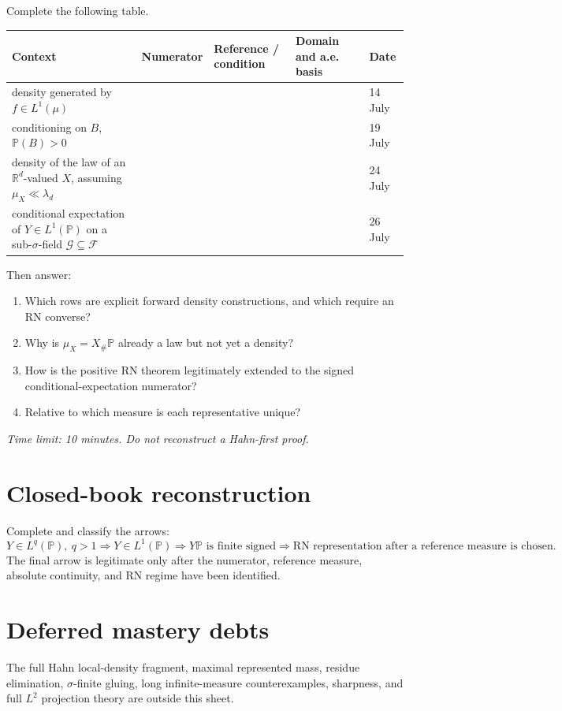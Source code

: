 Complete the following table.

\begin{center}
\begin{tabular}{p{32mm}p{34mm}p{31mm}p{30mm}p{21mm}}
\textbf{Context} & \textbf{Numerator} & \textbf{Reference / condition} & \textbf{Domain and a.e. basis} & \textbf{Date}\\
\hline
density generated by $f\in L^1(\mu)$ & & & & 14 July\\[2.0em]
conditioning on $B$, $\mathbb P(B)>0$ & & & & 19 July\\[2.0em]
density of the law of an $\mathbb R^d$-valued $X$, assuming $\mu_X\ll\lambda_d$ & & & & 24 July\\[2.0em]
conditional expectation of $Y\in L^1(\mathbb P)$ on a sub-$\sigma$-field $\mathcal G\subseteq\mathcal F$ & & & & 26 July
\end{tabular}
\end{center}

Then answer:
\begin{enumerate}
  \item Which rows are explicit forward density constructions, and which require an RN converse?
  \item Why is $\mu_X=X_\#\mathbb P$ already a law but not yet a density?
  \item How is the positive RN theorem legitimately extended to the signed conditional-expectation numerator?
  \item Relative to which measure is each representative unique?
\end{enumerate}

\emph{Time limit: 10 minutes. Do not reconstruct a Hahn-first proof.}

\section*{Closed-book reconstruction}

Complete and classify the arrows:
\[
\boxed{Y\in L^q(\mathbb P),\ q>1}
\Longrightarrow
\boxed{Y\in L^1(\mathbb P)}
\Longrightarrow
\boxed{Y\mathbb P\text{ is finite signed}}
\Longrightarrow
\boxed{\text{RN representation after a reference measure is chosen}}.
\]
The final arrow is legitimate only after the numerator, reference measure, absolute continuity, and RN regime have been identified.

\section*{Deferred mastery debts}

The full Hahn local-density fragment, maximal represented mass, residue elimination, $\sigma$-finite gluing, long infinite-measure counterexamples, sharpness, and full $L^2$ projection theory are outside this sheet.
